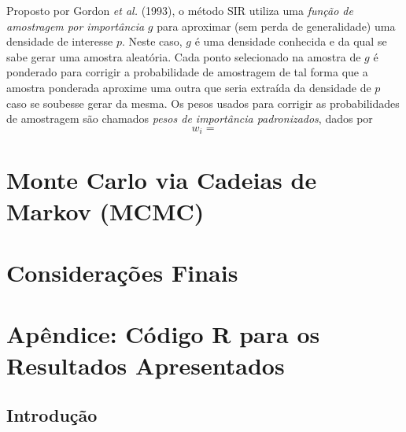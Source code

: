 \documentclass[12pt,reqno,a4paper,oneside]{article}
\begin{document}
Proposto por Gordon \textit{et al.} (1993)\cite{Gordon1993}, o método SIR utiliza uma \textit{função de amostragem por importância} $g$ para aproximar (sem perda de generalidade) uma densidade de interesse $p$. Neste caso, $g$ é uma densidade conhecida e da qual se sabe gerar uma amostra aleatória. Cada ponto selecionado na amostra de $g$ é ponderado para corrigir a probabilidade de amostragem de tal forma que a amostra ponderada aproxime uma outra que seria extraída da densidade de $p$ caso se soubesse gerar da mesma. Os pesos usados para corrigir as probabilidades de amostragem são chamados \textit{pesos de importância padronizados}, dados por
\begin{equation}
w_i = 
\end{equation}


\section{Monte Carlo via Cadeias de Markov (MCMC)}\label{mcmc}


\section{Considerações Finais}\label{consfin}





\newpage

\section*{Apêndice: Código R para os Resultados Apresentados}

\subsection*{Introdução}
\end{document}
